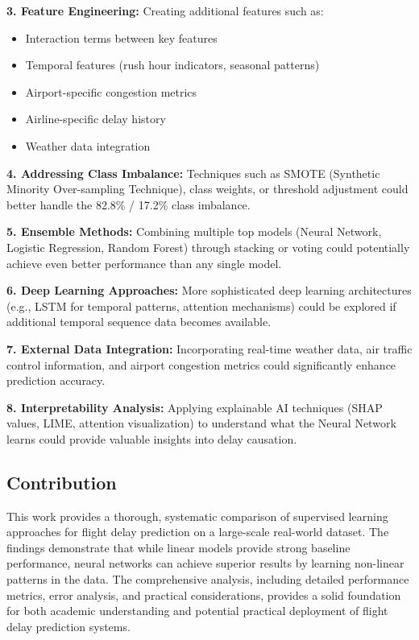 \documentclass[sigconf]{acmart}
\begin{document}
\textbf{3. Feature Engineering:} Creating additional features such as:
\begin{itemize}
    \item Interaction terms between key features
    \item Temporal features (rush hour indicators, seasonal patterns)
    \item Airport-specific congestion metrics
    \item Airline-specific delay history
    \item Weather data integration
\end{itemize}

\textbf{4. Addressing Class Imbalance:} Techniques such as SMOTE (Synthetic Minority Over-sampling Technique), class weights, or threshold adjustment could better handle the 82.8\% / 17.2\% class imbalance.

\textbf{5. Ensemble Methods:} Combining multiple top models (Neural Network, Logistic Regression, Random Forest) through stacking or voting could potentially achieve even better performance than any single model.

\textbf{6. Deep Learning Approaches:} More sophisticated deep learning architectures (e.g., LSTM for temporal patterns, attention mechanisms) could be explored if additional temporal sequence data becomes available.

\textbf{7. External Data Integration:} Incorporating real-time weather data, air traffic control information, and airport congestion metrics could significantly enhance prediction accuracy.

\textbf{8. Interpretability Analysis:} Applying explainable AI techniques (SHAP values, LIME, attention visualization) to understand what the Neural Network learns could provide valuable insights into delay causation.

\subsection{Contribution}

This work provides a thorough, systematic comparison of supervised learning approaches for flight delay prediction on a large-scale real-world dataset. The findings demonstrate that while linear models provide strong baseline performance, neural networks can achieve superior results by learning non-linear patterns in the data. The comprehensive analysis, including detailed performance metrics, error analysis, and practical considerations, provides a solid foundation for both academic understanding and potential practical deployment of flight delay prediction systems.
\end{document}
